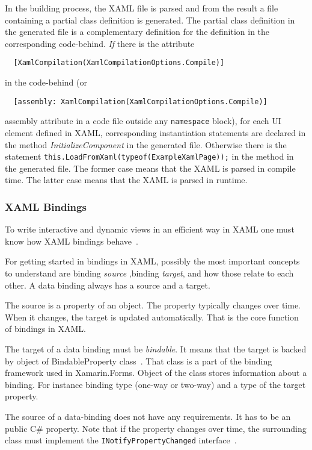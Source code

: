 \documentclass[conference]{IEEEtran}
\newcommand{\code}[1]{{\small\texttt{#1}}}
\begin{document}
In the building process, the XAML file is parsed and from the result a file containing a partial class definition is generated. The partial class definition in the generated file is a complementary definition for the definition in the corresponding code-behind. \emph{If} there is the attribute~\cite{attribute}
\begin{lstlisting}
  [XamlCompilation(XamlCompilationOptions.Compile)]
\end{lstlisting}
in the code-behind (or
\begin{lstlisting}
  [assembly: XamlCompilation(XamlCompilationOptions.Compile)]
\end{lstlisting}
assembly attribute in a code file outside any \code{namespace} block), for each UI element defined in XAML, corresponding instantiation statements are declared in the method \emph{InitializeComponent} in the generated file. Otherwise there is the statement \code{this.LoadFromXaml(typeof(ExampleXamlPage));} in the method in the generated file. The former case means that the XAML is parsed in compile time. The latter case means that the XAML is parsed in runtime.

\subsubsection{XAML Bindings}

To write interactive and dynamic views in an efficient way in XAML one must know how XAML bindings behave~\cite{databinding}.

For getting started in bindings in XAML, possibly the most important concepts to understand are binding \emph{source} ,binding \emph{target}, and how those relate to each other. A data binding always has a source and a target.

The source is a property of an object. The property typically changes over time. When it changes, the target is updated automatically. That is the core function of bindings in XAML.

The target of a data binding must be \emph{bindable}. It means that the target is backed by object of BindableProperty class~\cite{bindablepropertyclass}. That class is a part of the binding framework used in Xamarin.Forms. Object of the class stores information about a binding. For instance binding type (one-way or two-way) and a type of the target property.

The source of a data-binding does not have any requirements. It has to be an public C\# property. Note that if the property changes over time, the surrounding class must implement the \code{INotifyPropertyChanged} interface~\cite{inotifypropertychanged}.
\end{document}
